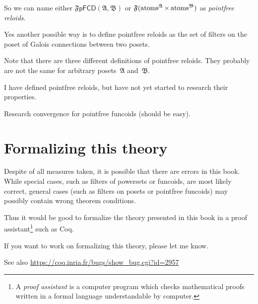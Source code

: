 So we can name either $\mathfrak{F}\mathsf{pFCD}(\mathfrak{A},\mathfrak{B})$
or $\mathfrak{F}(\operatorname{atoms}^{\mathfrak{A}}\times\operatorname{atoms}^{\mathfrak{B}})$
as \emph{pointfree reloids}.

Yes another possible way is to define pointfree reloids as the set of filters on the poset of Galois connections
between two posets.

Note that there are three different definitions of pointfree reloids.
They probably are not the same for arbitrary posets~$\mathfrak{A}$
and~$\mathfrak{B}$.

I have defined pointfree reloids, but have not yet started to research
their properties.

Research convergence for pointfree funcoids (should be easy).


\section{Formalizing this theory}

Despite of all measures taken, it is possible that there are errors
in this book. While special cases, such as filters of powersets or
funcoids, are most likely correct, general cases (such as filters
on posets or pointfree funcoids) may possibly contain wrong theorem
conditions.

Thus it would be good to formalize the theory presented in this book
in a proof assistant\footnote{A \emph{proof assistant} is a computer program which checks mathematical
proofs written in a formal language understandable by computer.} such as Coq.

If you want to work on formalizing this theory, please let me know.

See also \href{https://coq.inria.fr/bugs/show_bug.cgi?id=2957}{https://coq.inria.fr/bugs/show\_{}bug.cgi?id=2957}
